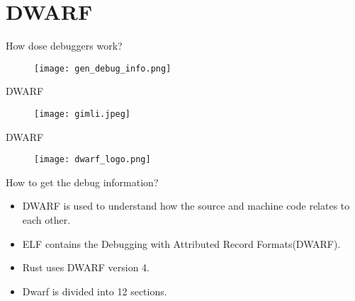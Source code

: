 \section{DWARF}
\begin{frame}{How dose debuggers work?}
	\begin{figure}
		\texttt{[image: gen\_debug\_info.png]}
	\end{figure}
\end{frame}

\begin{frame}{DWARF}
	\begin{figure}
		\texttt{[image: gimli.jpeg]}
	\end{figure}
\end{frame}


\begin{frame}{DWARF}
	\begin{figure}
		\texttt{[image: dwarf\_logo.png]}
	\end{figure}
\end{frame}

\begin{frame}{How to get the debug information?}
    \begin{itemize}
	    \item DWARF is used to understand how the source and machine code relates to each other.
	    \item ELF contains the Debugging with Attributed Record Formats(DWARF).
	    \item Rust uses DWARF version 4.
	    \item Dwarf is divided into 12 sections.
    \end{itemize}
\end{frame}

